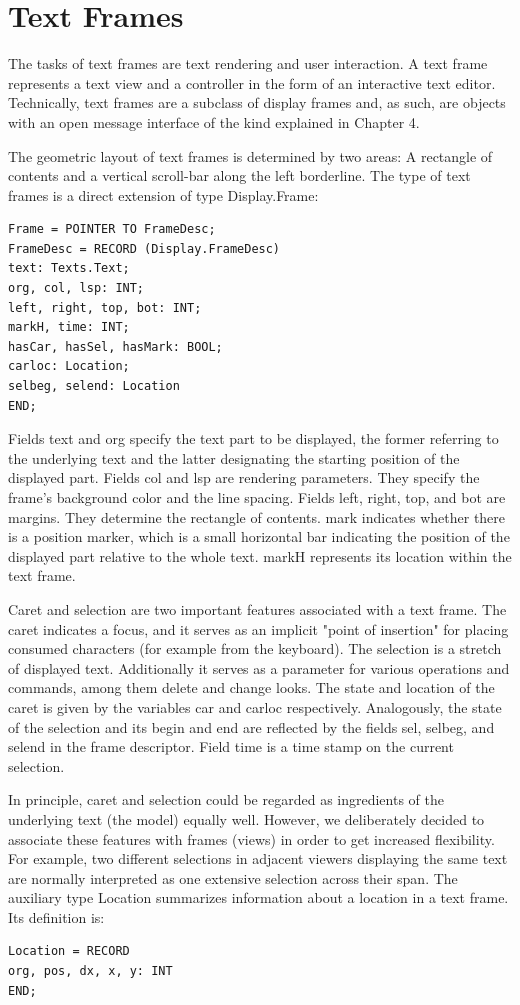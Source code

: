 \section{Text Frames}
\label{sec:textframes}
The tasks of text frames are text rendering and user interaction. A text frame represents a text view
and a controller in the form of an interactive text editor. Technically, text frames are a subclass of
display frames and, as such, are objects with an open message interface of the kind explained in
Chapter 4.

The geometric layout of text frames is determined by two areas: A rectangle of contents and a
vertical scroll-bar along the left borderline. The type of text frames is a direct extension of type
Display.Frame:
\begin{verbatim}
Frame = POINTER TO FrameDesc;
FrameDesc = RECORD (Display.FrameDesc)
text: Texts.Text;
org, col, lsp: INT;
left, right, top, bot: INT;
markH, time: INT;
hasCar, hasSel, hasMark: BOOL;
carloc: Location;
selbeg, selend: Location
END;
\end{verbatim}

Fields text and org specify the text part to be displayed, the former referring to the underlying text
and the latter designating the starting position of the displayed part. Fields col and lsp are rendering
parameters. They specify the frame's background color and the line spacing. Fields left, right, top,
and bot are margins. They determine the rectangle of contents. mark indicates whether there is a
position marker, which is a small horizontal bar indicating the position of the displayed part relative
to the whole text. markH represents its location within the text frame.

Caret and selection are two important features associated with a text frame. The caret indicates a
focus, and it serves as an implicit "point of insertion" for placing consumed characters (for example
from the keyboard). The selection is a stretch of displayed text. Additionally it serves as a
parameter for various operations and commands, among them delete and change looks. The state
and location of the caret is given by the variables car and carloc respectively. Analogously, the
state of the selection and its begin and end are reflected by the fields sel, selbeg, and selend in the
frame descriptor. Field time is a time stamp on the current selection.

In principle, caret and selection could be regarded as ingredients of the underlying text (the model)
equally well. However, we deliberately decided to associate these features with frames (views) in
order to get increased flexibility. For example, two different selections in adjacent viewers
displaying the same text are normally interpreted as one extensive selection across their span.
The auxiliary type Location summarizes information about a location in a text frame. Its definition is:
\begin{verbatim}
Location = RECORD
org, pos, dx, x, y: INT
END;
\end{verbatim}

